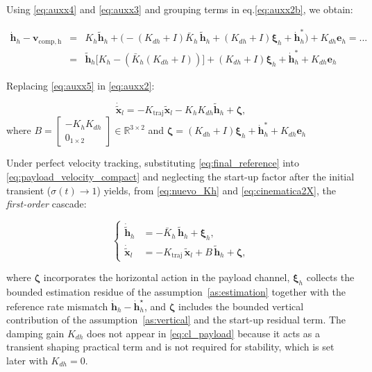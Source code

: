 \documentclass[sn-mathphys-num]{sn-jnl}
\theoremstyle{thmstyleone}%
\theoremstyle{thmstyletwo}%
\theoremstyle{thmstylethree}%
\begin{document}
Using \eqref{eq:auxx4} and \eqref{eq:auxx3} and grouping terms in eq.\eqref{eq:auxx2b}, we obtain:

\begin{eqnarray}
\dot{\mathbf{h}}_h-\nonumber\mathbf{v}_{\mathrm{comp,h}}&=&K_{h}\tilde{\mathbf{h}}_h +\Big(-(K_{dh}+I)\bar{K}_h\,\tilde{\mathbf{h}}_h +(K_{dh}+I)\boldsymbol{\xi}_h+\dot{\mathbf{h}}^*_h\Big)+K_{dh}\mathbf{e}_{h}=...\\
&=&\tilde{\mathbf{h}}_h\Big[K_{h}-(\bar{K}_{h}(K_{dh}+I))\Big]+(K_{dh}+I)\boldsymbol{\xi}_h+\dot{\mathbf{h}}^*_h+K_{dh}\mathbf{e}_{h}
\label{eq:auxx5}
\end{eqnarray}

Replacing \eqref{eq:auxx5} in \eqref{eq:auxx2}:

\begin{equation}
\dot{\tilde{\mathbf{x}}}_{l}
=-K_{\mathrm{traj}}
\tilde{\mathbf{x}}_l
-K_{h}K_{dh}\tilde{\mathbf{h}}_h+\boldsymbol{\zeta},
\label{eq:cinematica2X}
\end{equation}
where $B=\begin{bmatrix} -K_h K_{dh} \\ 0_{1 \times 2} \end{bmatrix}\in\mathbb{R}^{3\times2}$ and  $\boldsymbol{\zeta}=(K_{dh}+I)\boldsymbol{\xi}_h+\dot{\mathbf{h}}^*_h+K_{dh}\mathbf{e}_{h}$

Under perfect velocity tracking, substituting \eqref{eq:final_reference} into
\eqref{eq:payload_velocity_compact} and neglecting the start-up factor after the
initial transient ($\sigma(t)\to 1$) yields, from \eqref{eq:nuevo_Kh} and \eqref{eq:cinematica2X}, the \emph{first-order} cascade:

\begin{equation}\label{eq:cl_payload}
\left\{
\begin{aligned} 
    \dot{\tilde{\mathbf{h}}}_h
&= -\bar{K}_h\,\tilde{\mathbf{h}}_h + \boldsymbol{\xi}_h,\\
\dot{\tilde{\mathbf{x}}}_l
&= -K_{\mathrm{traj}}\,\tilde{\mathbf{x}}_l
   + B\,\tilde{\mathbf{h}}_h
   + \boldsymbol{\zeta},
\end{aligned}
\right.
\end{equation}

where $\boldsymbol{\zeta}$ incorporates the horizontal action in the payload channel, $\boldsymbol{\xi}_h$ collects the bounded estimation residue of the assumption~\ref{as:estimation} together with the reference rate mismatch $\dot{\mathbf{h}}_h-\dot{\mathbf{h}}_h^\star$, and $\boldsymbol{\zeta}$ includes the bounded vertical contribution of the assumption~\ref{as:vertical} and the start-up residual term. The damping gain $K_{dh}$ does not appear in \eqref{eq:cl_payload} because it acts as a transient shaping practical term and is not required for stability, which is set later with $K_{dh}=0$.
\end{document}
